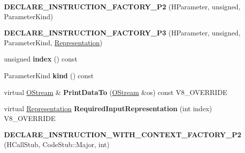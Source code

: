 \begin{DoxyCompactItemize}
\item 
\hypertarget{classv8_1_1internal_1_1_v8___f_i_n_a_l_ad4419444a628d545e299a30b46b33110}{}{\bfseries D\+E\+C\+L\+A\+R\+E\+\_\+\+I\+N\+S\+T\+R\+U\+C\+T\+I\+O\+N\+\_\+\+F\+A\+C\+T\+O\+R\+Y\+\_\+\+P2} (H\+Parameter, unsigned, Parameter\+Kind)\label{classv8_1_1internal_1_1_v8___f_i_n_a_l_ad4419444a628d545e299a30b46b33110}

\item 
\hypertarget{classv8_1_1internal_1_1_v8___f_i_n_a_l_a59b6a38559773d3dbc0dec949081dd38}{}{\bfseries D\+E\+C\+L\+A\+R\+E\+\_\+\+I\+N\+S\+T\+R\+U\+C\+T\+I\+O\+N\+\_\+\+F\+A\+C\+T\+O\+R\+Y\+\_\+\+P3} (H\+Parameter, unsigned, Parameter\+Kind, \hyperlink{classv8_1_1internal_1_1_representation}{Representation})\label{classv8_1_1internal_1_1_v8___f_i_n_a_l_a59b6a38559773d3dbc0dec949081dd38}

\item 
\hypertarget{classv8_1_1internal_1_1_v8___f_i_n_a_l_a5af8392c5e756056b75f4f008ead376d}{}unsigned {\bfseries index} () const \label{classv8_1_1internal_1_1_v8___f_i_n_a_l_a5af8392c5e756056b75f4f008ead376d}

\item 
\hypertarget{classv8_1_1internal_1_1_v8___f_i_n_a_l_af695f4c8da9cc7cf28b82cb4ab2060fc}{}Parameter\+Kind {\bfseries kind} () const \label{classv8_1_1internal_1_1_v8___f_i_n_a_l_af695f4c8da9cc7cf28b82cb4ab2060fc}

\item 
\hypertarget{classv8_1_1internal_1_1_v8___f_i_n_a_l_ac450dad970b14246be761ccf5004924b}{}virtual \hyperlink{classv8_1_1internal_1_1_o_stream}{O\+Stream} \& {\bfseries Print\+Data\+To} (\hyperlink{classv8_1_1internal_1_1_o_stream}{O\+Stream} \&os) const V8\+\_\+\+O\+V\+E\+R\+R\+I\+D\+E\label{classv8_1_1internal_1_1_v8___f_i_n_a_l_ac450dad970b14246be761ccf5004924b}

\item 
\hypertarget{classv8_1_1internal_1_1_v8___f_i_n_a_l_a6c6d1f37f40b113d8f4062f1ffff7215}{}virtual \hyperlink{classv8_1_1internal_1_1_representation}{Representation} {\bfseries Required\+Input\+Representation} (int index) V8\+\_\+\+O\+V\+E\+R\+R\+I\+D\+E\label{classv8_1_1internal_1_1_v8___f_i_n_a_l_a6c6d1f37f40b113d8f4062f1ffff7215}

\item 
\hypertarget{classv8_1_1internal_1_1_v8___f_i_n_a_l_a0e3f13e6fde9b1c9839d0779b18f459e}{}{\bfseries D\+E\+C\+L\+A\+R\+E\+\_\+\+I\+N\+S\+T\+R\+U\+C\+T\+I\+O\+N\+\_\+\+W\+I\+T\+H\+\_\+\+C\+O\+N\+T\+E\+X\+T\+\_\+\+F\+A\+C\+T\+O\+R\+Y\+\_\+\+P2} (H\+Call\+Stub, Code\+Stub\+::\+Major, int)\label{classv8_1_1internal_1_1_v8___f_i_n_a_l_a0e3f13e6fde9b1c9839d0779b18f459e}


\end{DoxyCompactItemize}
